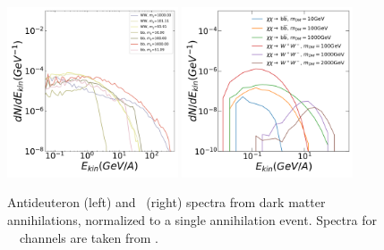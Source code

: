 \begin{figure}[hbpt]
    \centering
    \includegraphics[width=0.45\textwidth]{figures/dbar_injectionSpectra.pdf}
    \includegraphics[width=0.45\textwidth]{figures/he3_dm_source_spectra.png}
    \caption{Antideuteron (left) and \ahe\ (right) spectra from dark matter annihilations, normalized to a single annihilation event. Spectra for \WW\ \bb\ channels are taken from \cite{Ibarra:2012cc}. }
    \label{fig:DMsource_spectra}
\end{figure}



